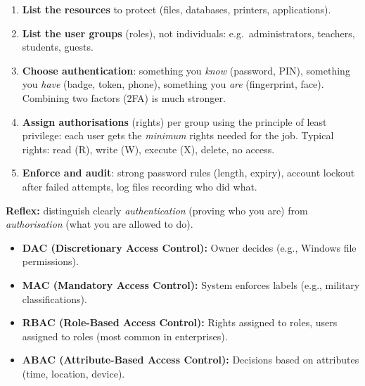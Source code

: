 \documentclass[11pt]{article}
\newcommand{\cle}[1]{{\popxbold\color{popdark}#1}}
\begin{document}
\begin{methode}
\begin{enumerate}
\item \textbf{List the resources} to protect (files, databases, printers, applications).
\item \textbf{List the user groups} (roles), not individuals: e.g.\ administrators, teachers, students, guests.
\item \textbf{Choose authentication}: something you \emph{know} (password, PIN), something you \emph{have} (badge, token, phone), something you \emph{are} (fingerprint, face). Combining two factors (\cle{2FA}) is much stronger.
\item \textbf{Assign authorisations} (rights) per group using the \cle{principle of least privilege}: each user gets the \emph{minimum} rights needed for the job. Typical rights: read (R), write (W), execute (X), delete, no access.
\item \textbf{Enforce and audit}: strong password rules (length, expiry), account lockout after failed attempts, log files recording who did what.
\end{enumerate}
\textbf{Reflex:} distinguish clearly \emph{authentication} (proving who you are) from \emph{authorisation} (what you are allowed to do).
\end{methode}

\begin{aretenir}
\begin{itemize}
\item \textbf{DAC (Discretionary Access Control):} Owner decides (e.g., Windows file permissions).
\item \textbf{MAC (Mandatory Access Control):} System enforces labels (e.g., military classifications).
\item \textbf{RBAC (Role-Based Access Control):} Rights assigned to roles, users assigned to roles (most common in enterprises).
\item \textbf{ABAC (Attribute-Based Access Control):} Decisions based on attributes (time, location, device).
\end{itemize}
\end{aretenir}
\end{document}
